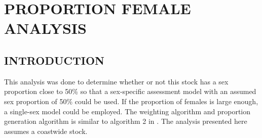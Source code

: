 \documentclass[11pt]{book}\usepackage[]{graphicx}\usepackage[]{color}
\begin{document}

\renewcommand{\thesection}{\thechapter.\arabic{section}}
\renewcommand{\thetable}{\thechapter.\arabic{table}}
\renewcommand{\thefigure}{\thechapter.\arabic{figure}}
\renewcommand{\theequation}{\thechapter.\arabic{equation}}









\clearpage
\chapter{PROPORTION FEMALE ANALYSIS}
\label{chap:propfemale}

\section{INTRODUCTION}
This analysis was done to determine whether or not this stock has a sex proportion close to 50\% so that a sex-specific assessment model with an assumed sex proportion of 50\% could be used. If the proportion of females is large enough, a single-sex model could be employed. The weighting algorithm and proportion generation algorithm is similar to algorithm 2 in \citet{rocksole2013}. The analysis presented here assumes a coastwide stock.
\end{document}
